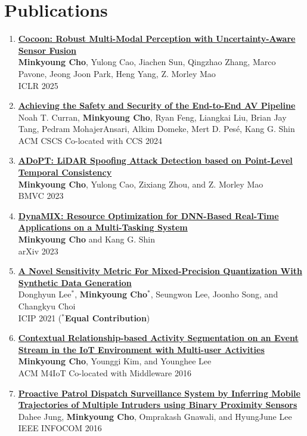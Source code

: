 \documentclass[letterpaper,oneside,11pt]{article}
\begin{document}
\section{Publications}
\begin{enumerate}[leftmargin=*, itemsep=0em]
  \item \small \textbf{\href{https://minkyoungcho.github.io/research/}{Cocoon: Robust Multi-Modal Perception with
  Uncertainty-Aware Sensor Fusion}} \\
  \textbf{Minkyoung Cho}, Yulong Cao, Jiachen Sun, Qingzhao Zhang, Marco Pavone, Jeong Joon Park, Heng Yang, Z. Morley Mao\\ 
  ICLR 2025
  \item \small \textbf{\href{https://minkyoungcho.github.io/research/}{Achieving the Safety and Security of the End-to-End AV Pipeline}}\\
  Noah T. Curran, \textbf{Minkyoung Cho}, Ryan Feng, Liangkai Liu, Brian Jay Tang, Pedram MohajerAnsari, Alkim Domeke, Mert D. Pesé, Kang G. Shin\\
  ACM CSCS Co-located with CCS 2024 
  \item \small \textbf{\href{https://arxiv.org/abs/2310.14504}{ADoPT: LiDAR Spoofing Attack Detection based on Point-Level Temporal Consistency}}\\
  \textbf{Minkyoung Cho}, Yulong Cao, Zixiang Zhou, and Z. Morley Mao\\
  BMVC 2023
  \item \small  \textbf{\href{https://arxiv.org/abs/2302.01568}{DynaMIX: Resource Optimization for DNN-Based Real-Time Applications on a Multi-Tasking System}}\\
  \textbf{Minkyoung Cho} and Kang G. Shin\\
  arXiv 2023
  \item \small \textbf{\href{https://ieeexplore.ieee.org/abstract/document/9506527}{A Novel Sensitivity Metric For Mixed-Precision Quantization With Synthetic Data Generation}}\\
  Donghyun Lee$^\ast$, \textbf{Minkyoung Cho$^\ast$}, Seungwon Lee, Joonho Song, and Changkyu Choi \\
  ICIP 2021 ($^\ast$\textbf{Equal Contribution})
  \item \small \textbf{\href{https://dl.acm.org/doi/10.1145/3008631.3008633}{Contextual Relationship-based Activity Segmentation on an Event Stream in the IoT Environment with Multi-user Activities}}\\
  \textbf{Minkyoung Cho}, Younggi Kim, and Younghee Lee\\
  ACM M4IoT Co-located with Middleware 2016
  \item \small \textbf{\href{https://ieeexplore.ieee.org/abstract/document/7524369}{Proactive Patrol Dispatch Surveillance System by Inferring Mobile Trajectories of Multiple Intruders using Binary Proximity Sensors}}\\
  Dahee Jung, \textbf{Minkyoung Cho}, Omprakash Gnawali, and HyungJune Lee\\  
  IEEE INFOCOM 2016
\end{enumerate}
\end{document}
